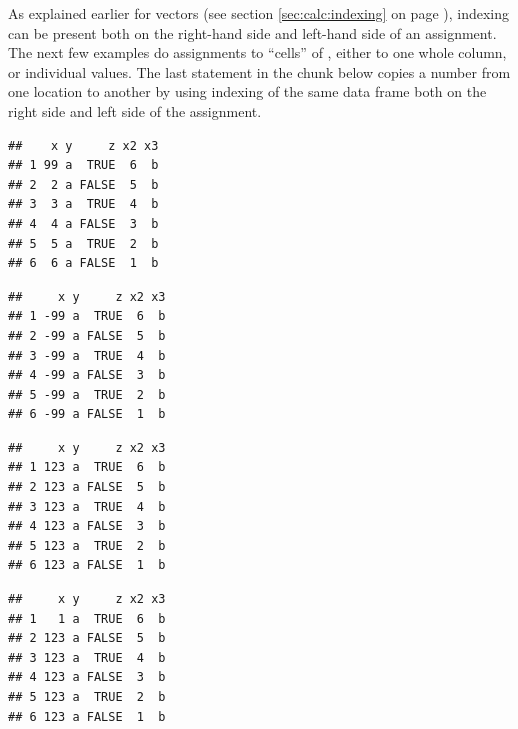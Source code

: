 \documentclass[krantz2]{krantz}\usepackage{knitr}
\begin{document}
As explained earlier for vectors (see section \ref{sec:calc:indexing} on page \pageref{sec:calc:indexing}), indexing can be present both on the right-hand side and left-hand side of an assignment.
The next few examples do assignments to ``cells'' of , either to one whole column, or individual values. The last statement in the chunk below copies a number from one location to another by using indexing of the same data frame both on the right side and left side of the assignment.\qRoperator{[[]]}\qRoperator{[]}

\begin{knitrout}\footnotesize
{}\color{fgcolor}\begin{kframe}
\begin{alltt}
\hlstd{a.df[}\hlstd{,} \hlstd{]} \hlkwb{<-} 
\end{alltt}
\begin{verbatim}
##    x y     z x2 x3
## 1 99 a  TRUE  6  b
## 2  2 a FALSE  5  b
## 3  3 a  TRUE  4  b
## 4  4 a FALSE  3  b
## 5  5 a  TRUE  2  b
## 6  6 a FALSE  1  b
\end{verbatim}
\begin{alltt}
\hlstd{a.df[ ,} \hlstd{]} \hlkwb{<-} \hlopt{-}
\end{alltt}
\begin{verbatim}
##     x y     z x2 x3
## 1 -99 a  TRUE  6  b
## 2 -99 a FALSE  5  b
## 3 -99 a  TRUE  4  b
## 4 -99 a FALSE  3  b
## 5 -99 a  TRUE  2  b
## 6 -99 a FALSE  1  b
\end{verbatim}
\begin{alltt}
\hlstd{a.df[[}\hlstd{]]} \hlkwb{<-} 
\end{alltt}
\begin{verbatim}
##     x y     z x2 x3
## 1 123 a  TRUE  6  b
## 2 123 a FALSE  5  b
## 3 123 a  TRUE  4  b
## 4 123 a FALSE  3  b
## 5 123 a  TRUE  2  b
## 6 123 a FALSE  1  b
\end{verbatim}
\begin{alltt}
\hlstd{a.df[}\hlstd{,} \hlstd{]} \hlkwb{<-} \hlstd{a.df[}\hlstd{,} \hlstd{]}
\end{alltt}
\begin{verbatim}
##     x y     z x2 x3
## 1   1 a  TRUE  6  b
## 2 123 a FALSE  5  b
## 3 123 a  TRUE  4  b
## 4 123 a FALSE  3  b
## 5 123 a  TRUE  2  b
## 6 123 a FALSE  1  b
\end{verbatim}
\end{kframe}
\end{knitrout}
\end{document}
